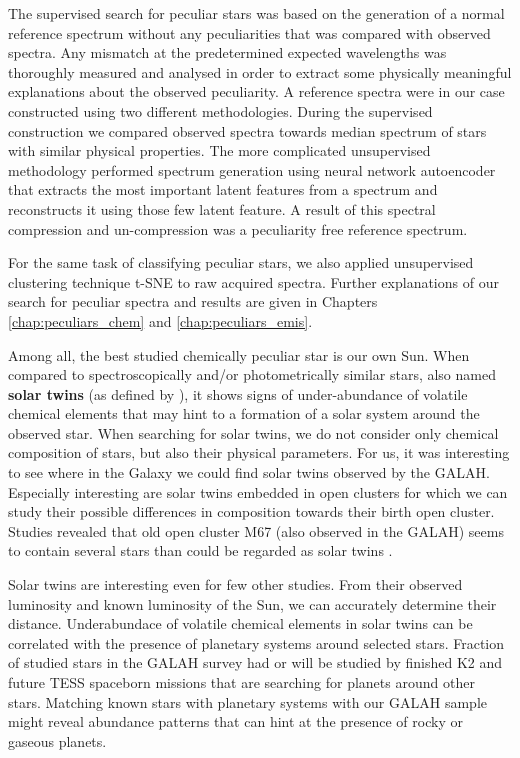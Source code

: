 The supervised search for peculiar stars was based on the generation of a normal reference spectrum without any peculiarities that was compared with observed spectra. Any mismatch at the predetermined expected wavelengths was thoroughly measured and analysed in order to extract some physically meaningful explanations about the observed peculiarity. A reference spectra were in our case constructed using two different methodologies. During the supervised construction we compared observed spectra towards median spectrum of stars with similar physical properties. The more complicated unsupervised methodology performed spectrum generation using neural network autoencoder that extracts the most important latent features from a spectrum and reconstructs it using those few latent feature. A result of this spectral compression and un-compression was a peculiarity free reference spectrum.

For the same task of classifying peculiar stars, we also applied unsupervised clustering technique t-SNE \cite{2013arXiv1301.3342V} to raw acquired spectra. Further explanations of our search for peculiar spectra and results are given in Chapters \ref{chap:peculiars_chem} and \ref{chap:peculiars_emis}.

Among all, the best studied chemically peculiar star is our own Sun. When compared to spectroscopically and/or photometrically similar stars, also named \textbf{solar twins} (as defined by \cite{2017AN....338..442A}), it shows signs of under-abundance of volatile chemical elements \cite{2009ApJ...704L..66M} that may hint to a formation of a solar system around the observed star. When searching for solar twins, we do not consider only chemical composition of stars, but also their physical parameters. For us, it was interesting to see where in the Galaxy we could find solar twins observed by the GALAH. Especially interesting are solar twins embedded in open clusters for which we can study their possible differences in composition towards their birth open cluster. Studies revealed that old open cluster M67 (also observed in the GALAH) seems to contain several stars than could be regarded as solar twins \cite{2009MmSAI..80..125B, 2016MNRAS.463..696L}.

Solar twins are interesting even for few other studies. From their observed luminosity and known luminosity of the Sun, we can accurately determine their distance. Underabundace of volatile chemical elements in solar twins can be correlated with the presence of planetary systems around selected stars. Fraction of studied stars in the GALAH survey had or will be studied by finished K2 \cite{2014PASP..126..398H} and future TESS \cite{2014SPIE.9143E..20R} spaceborn missions that are searching for planets around other stars. Matching known stars with planetary systems with our GALAH sample might reveal abundance patterns that can hint at the presence of rocky or gaseous planets.

